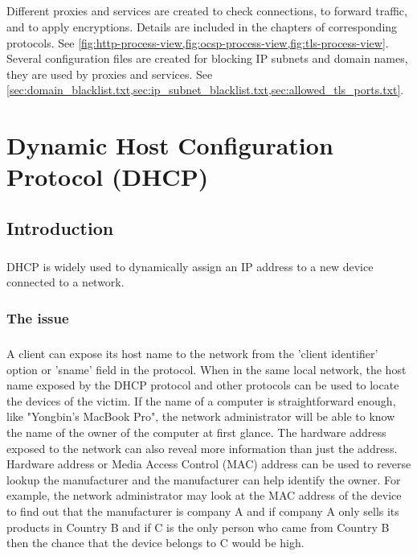 \documentclass[mscthesis]{usiinfthesis}
\begin{document}
\paragraph{}
Different proxies and services are created to check connections, to forward traffic, and to apply encryptions. Details are included in the chapters of corresponding protocols. See \cref{fig:http-process-view,fig:ocsp-process-view,fig:tls-process-view}. Several configuration files are created for blocking IP subnets and domain names, they are used by proxies and services. See \cref{sec:domain_blacklist.txt,sec:ip_subnet_blacklist.txt,sec:allowed_tls_ports.txt}.

\chapter{Dynamic Host Configuration Protocol (DHCP)}\label{cha:dhcp}

\section{Introduction}
\paragraph{}
DHCP is widely used to dynamically assign an IP address to a new device connected to a network.

\subsection{The issue}
\paragraph{}
A client can expose its host name to the network from the 'client identifier' option or 'sname' field in the protocol.\citep{rfc:dhcp} When in the same local network, the host name exposed by the DHCP protocol and other protocols can be used to locate the devices of the victim. If the name of a computer is straightforward enough, like "Yongbin's MacBook Pro", the network administrator will be able to know the name of the owner of the computer at first glance. The hardware address exposed to the network can also reveal more information than just the address. Hardware address or Media Access Control (MAC) address can be used to reverse lookup the manufacturer and the manufacturer can help identify the owner. For example, the network administrator may look at the MAC address of the device to find out that the manufacturer is company A and if company A only sells its products in Country B and if C is the only person who came from Country B then the chance that the device belongs to C would be high.
\end{document}
